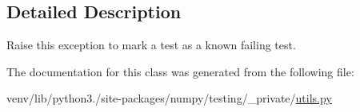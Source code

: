 \subsection{Detailed Description}
\begin{DoxyVerb}Raise this exception to mark a test as a known failing test.\end{DoxyVerb}
 

The documentation for this class was generated from the following file\+:\begin{DoxyCompactItemize}
\item 
venv/lib/python3./site-\/packages/numpy/testing/\+\_\+private/\hyperlink{numpy_2testing_2__private_2utils_8py}{utils.\+py}\end{DoxyCompactItemize}
